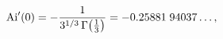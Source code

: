 \[\mathop{\mathrm{Ai}\/}\nolimits'\!\left(0\right)=-\frac{1}{3^{1/3}\mathop{%
\Gamma\/}\nolimits\!\left(\tfrac{1}{3}\right)}=-0.25881\;94037\ldots,\]